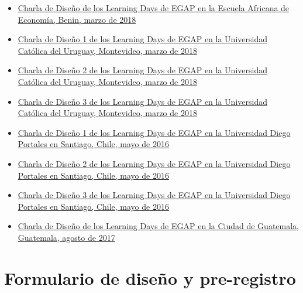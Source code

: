\documentclass[
  12pt,
  spanish,
]{book}
\begin{document}
\begin{itemize}
\item
  \href{https://egap.github.io/learningdays-resources/Slides/Examples/research_design_2-benin.pdf}{Charla de Diseño de los Learning Days de EGAP en la Escuela Africana de Economía, Benin, marzo de 2018}
\item
  \href{https://egap.github.io/learningdays-resources/Slides/Examples/research_design_1-montevideo.pdf}{Charla de Diseño 1 de los Learning Days de EGAP en la Universidad Católica del Uruguay, Montevideo, marzo de 2018}
\item
  \href{https://egap.github.io/learningdays-resources/Slides/Examples/research_design_2-montevideo.pdf}{Charla de Diseño 2 de los Learning Days de EGAP en la Universidad Católica del Uruguay, Montevideo, marzo de 2018}
\item
  \href{https://egap.github.io/learningdays-resources/Slides/Examples/research_design_3-montevideo.pdf}{Charla de Diseño 3 de los Learning Days de EGAP en la Universidad Católica del Uruguay, Montevideo, marzo de 2018}
\item
  \href{https://egap.github.io/learningdays-resources/Slides/Examples/research_design_1-santiago.pdf}{Charla de Diseño 1 de los Learning Days de EGAP en la Universidad Diego Portales en Santiago, Chile, mayo de 2016}
\item
  \href{https://egap.github.io/learningdays-resources/Slides/Examples/research_design_2-santiago.pdf}{Charla de Diseño 2 de los Learning Days de EGAP en la Universidad Diego Portales en Santiago, Chile, mayo de 2016}
\item
  \href{https://egap.github.io/learningdays-resources/Slides/Examples/research_design_3-santiago.pdf}{Charla de Diseño 3 de los Learning Days de EGAP en la Universidad Diego Portales en Santiago, Chile, mayo de 2016}
\item
  \href{https://egap.github.io/learningdays-resources/Slides/Examples/research_design-guatemala.pdf}{Charla de Diseño de los Learning Days de EGAP en la Ciudad de Guatemala, Guatemala, agosto de 2017}
\end{itemize}

\hypertarget{formulario-de-diseuxf1o-y-pre-registro}{%
\section{Formulario de diseño y pre-registro}\label{formulario-de-diseuxf1o-y-pre-registro}}
\end{document}
